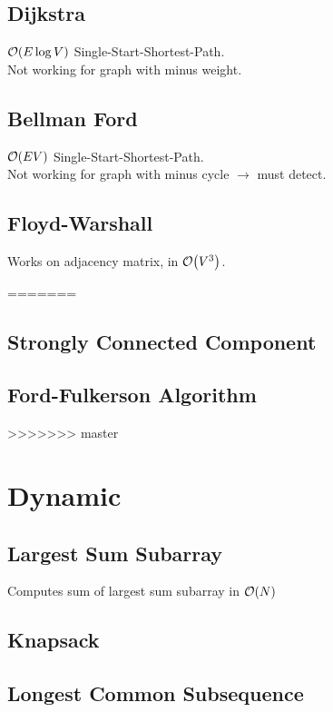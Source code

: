 \documentclass[landscape,8pt]{article}
\begin{document}
\begin{multicols}{2}
  \subsection{Dijkstra}
    $\order{E \log V}$ Single-Start-Shortest-Path.\\
    Not working for graph with minus weight.
      

  \subsection{Bellman Ford}
    $\order{EV}$ Single-Start-Shortest-Path.\\
    Not working for graph with minus cycle $\rightarrow$ must detect.
      

  \subsection{Floyd-Warshall}
    Works on adjacency matrix, in $\order{V^3}$.
      

=======

  \subsection{Strongly Connected Component}

  \subsection{Ford-Fulkerson Algorithm}
\columnbreak

>>>>>>> master
\section{Dynamic}
  \subsection{Largest Sum Subarray}
  Computes sum of largest sum subarray in $\order{N}$
    

  \subsection{Knapsack}

  \subsection{Longest Common Subsequence}
    

\end{multicols}
\end{document}
